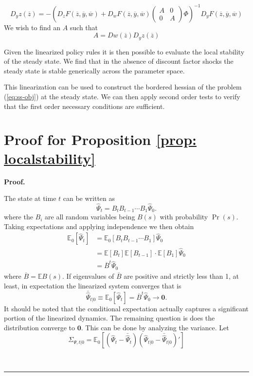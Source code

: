 \documentclass[thmsb,11pt]{article}
\newcommand{\bmat}{\begin{matrix}}
\newcommand{\emat}{\end{matrix}}
\newcommand{\ov}{\overline}
\newenvironment{proof}[1][Proof]{\noindent \textbf{#1.} }{\  \rule{0.5em}{0.5em}}
\begin{document}
\begin{appendix}
\begin{enumerate}
		\[
			  D_y z(\ov z) =-\left(D_zF(\ov z,\ov y, \ov w)+D_w F(\ov z, \ov y, \ov w)\left(\bmat A &0\\0&A\emat\right)\Phi\right)^{-1}D_yF(\ov z,\ov y,\ov w)
		\]  We wish to find an $A$ such that
		\[
			A = Dw(\ov z)   D_y z(\ov z)
		\]
	\end{enumerate}
Given the linearized policy rules it is then possible to evaluate the local stability of the steady state.  We find that in the absence of discount factor shocks the steady state is stable generically across the parameter space.

This linearization can be used to construct the bordered hessian of the problem (\ref{eq:ss-obj}) at the steady state. We can then apply second order tests to verify that the first order necessary conditions are sufficient.
\section{Proof for Proposition \ref{prop: localstability}}
 \begin{proof}

 The state at time $t$ can be written as
 	\[
 		\hat{\Psi}_t = B_tB_{t-1}\cdots B_1\hat{\Psi}_0.
 	\]where the $B_i$ are all random variables being $B(s)$ with probability $\Pr(s)$. Taking expectations and applying independence we then obtain
% 	
 	\begin{align}
 	\mathbb{E}_0[\hat{\Psi}_t] &= \mathbb{E}_0[B_tB_{t-1}\cdots B_1] \hat{\Psi}_0\\
 	&=\mathbb{E}[B_t] \mathbb{E}[B_{t-1}]\cdot\mathbb{E}[B_1] \hat{\Psi}_0\\
 	&=\overline B^t \hat{\Psi}_0
 	\end{align}
 	where $\overline B = \mathbb{E}B(s)$.  If eigenvalues of $\overline B$ are positive and strictly less than 1, at least, in expectation the linearized system converges that is
 	\begin{equation}
 		 \bar{\hat{\Psi}}_{t|0} \equiv \mathbb{E}_0[\hat{\Psi}_t] = \overline {B}^t \hat{\Psi}_0\to\bm 0.
 	\end{equation}It should be noted that the conditional expectation actually captures a significant portion of the linearized dynamics.
	The remaining question is does the distribution converge to $\bm 0$.  This can be done by analyzing the variance.  Let
 	\[
 		\Sigma_{\Psi,t|0} = \mathbb{E}_0\left[(\hat{\Psi}_t-\bar {\hat{\Psi}}_t)(\hat{\Psi}_{t|0}-\bar {\hat{\Psi}}_{t|0})'\right]
 	\]
 	

\end{proof}
\end{appendix}
\end{document}
